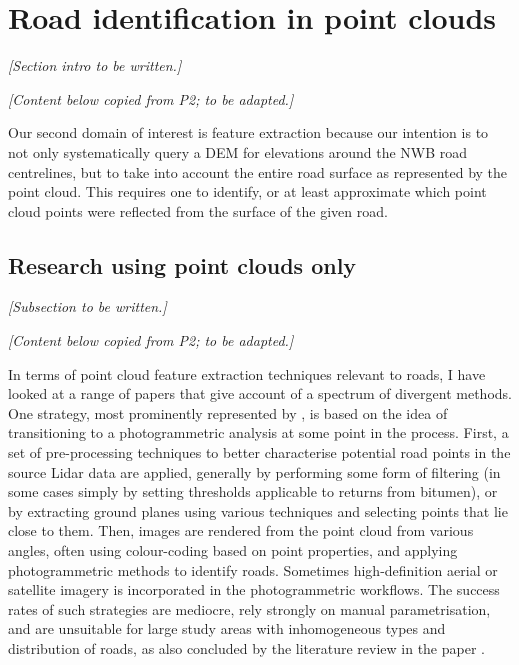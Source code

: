 \section{Road identification in point clouds}
\label{sec:roadidentification}

\textit{[Section intro to be written.]}

\textit{[Content below copied from P2; to be adapted.]}

Our second domain of interest is feature extraction because our intention is to not only systematically query a DEM for elevations around the NWB road centrelines, but to take into account the entire road surface as represented by the point cloud. This requires one to identify, or at least approximate which point cloud points were reflected from the surface of the given road.

\subsection{Research using point clouds only}
\label{sub:roadidentification_pconly}

\textit{[Subsection to be written.]}

\textit{[Content below copied from P2; to be adapted.]}

In terms of point cloud feature extraction techniques relevant to roads, I have looked at a range of papers that give account of a spectrum of divergent methods. One strategy, most prominently represented by \cite{hu_2003, hu_etal_2004, zhu_mordohai_2009, zhu_hyppa_2014, lin_etal_2015}, is based on the idea of transitioning to a photogrammetric analysis at some point in the process. First, a set of pre-processing techniques to better characterise potential road points in the source Lidar data are applied, generally by performing some form of filtering (in some cases simply by setting thresholds applicable to returns from bitumen), or by extracting ground planes using various techniques and selecting points that lie close to them. Then, images are rendered from the point cloud from various angles, often using colour-coding based on point properties, and applying photogrammetric methods to identify roads. Sometimes high-definition aerial or satellite imagery is incorporated in the photogrammetric workflows. The success rates of such strategies are mediocre, rely strongly on manual parametrisation, and are unsuitable for large study areas with inhomogeneous types and distribution of roads, as also concluded by the literature review in the paper \cite{yang_etal_2013}.

